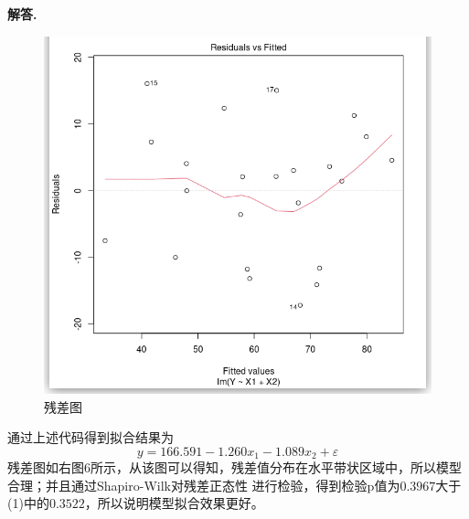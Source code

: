 \documentclass[12pt, a4paper, oneside]{ctexart}
\newenvironment{solution}[1][]{\par\noindent\textbf{#1解答. }}{\smallskip\par}  %
\begin{document}
\begin{solution}
\begin{figure} %
    \vspace{-0.5cm}
    \centering
    \includegraphics[scale=0.3]{./figures/2.9残差图step.png}
    \caption{残差图}
\end{figure}
    通过上述代码得到拟合结果为
    \begin{equation*}
        y = 166.591  -1.260x_1 -1.089x_2 + \varepsilon
    \end{equation*}
    残差图如右图6所示，从该图可以得知，残差值分布在水平带状区域中，所以模型合理；并且通过Shapiro-Wilk对残差正态性
    进行检验，得到检验p值为$0.3967$大于(1)中的$0.3522$，所以说明模型拟合效果更好。

    \ 

    \ 

    \ 
\end{solution}
\end{document}
